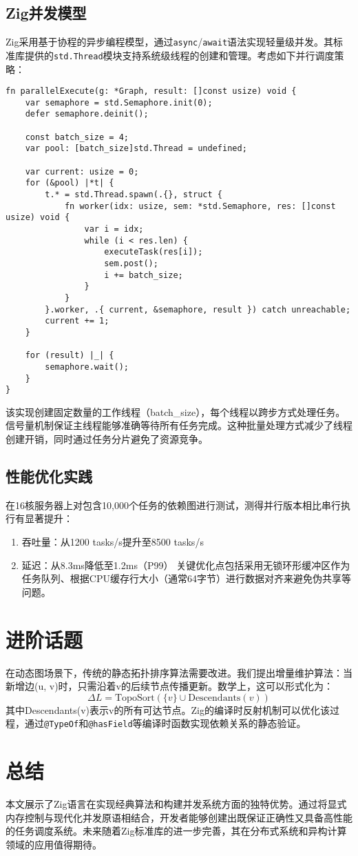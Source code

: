 \section{Zig并发模型}
Zig采用基于协程的异步编程模型，通过\verb!async!/\verb!await!语法实现轻量级并发。其标准库提供的\verb!std.Thread!模块支持系统级线程的创建和管理。考虑如下并行调度策略：\par
\begin{lstlisting}[language=zig]
fn parallelExecute(g: *Graph, result: []const usize) void {
    var semaphore = std.Semaphore.init(0);
    defer semaphore.deinit();

    const batch_size = 4;
    var pool: [batch_size]std.Thread = undefined;
    
    var current: usize = 0;
    for (&pool) |*t| {
        t.* = std.Thread.spawn(.{}, struct {
            fn worker(idx: usize, sem: *std.Semaphore, res: []const usize) void {
                var i = idx;
                while (i < res.len) {
                    executeTask(res[i]);
                    sem.post();
                    i += batch_size;
                }
            }
        }.worker, .{ current, &semaphore, result }) catch unreachable;
        current += 1;
    }

    for (result) |_| {
        semaphore.wait();
    }
}
\end{lstlisting}
该实现创建固定数量的工作线程（batch\_{}size），每个线程以跨步方式处理任务。信号量机制保证主线程能够准确等待所有任务完成。这种批量处理方式减少了线程创建开销，同时通过任务分片避免了资源竞争。\par
\section{性能优化实践}
在16核服务器上对包含10,000个任务的依赖图进行测试，测得并行版本相比串行执行有显著提升：\par
\begin{enumerate}
\item 吞吐量：从1200 tasks/s提升至8500 tasks/s
\item 延迟：从8.3ms降低至1.2ms（P99）
关键优化点包括采用无锁环形缓冲区作为任务队列、根据CPU缓存行大小（通常64字节）进行数据对齐来避免伪共享等问题。
\end{enumerate}
\chapter{进阶话题}
在动态图场景下，传统的静态拓扑排序算法需要改进。我们提出增量维护算法：当新增边(u, v)时，只需沿着v的后续节点传播更新。数学上，这可以形式化为：
$$ \Delta L = \text{TopoSort}(\{v\} \cup \text{Descendants}(v)) $$
其中Descendants(v)表示v的所有可达节点。Zig的编译时反射机制可以优化该过程，通过\verb!@TypeOf!和\verb!@hasField!等编译时函数实现依赖关系的静态验证。\par
\chapter{总结}
本文展示了Zig语言在实现经典算法和构建并发系统方面的独特优势。通过将显式内存控制与现代化并发原语相结合，开发者能够创建出既保证正确性又具备高性能的任务调度系统。未来随着Zig标准库的进一步完善，其在分布式系统和异构计算领域的应用值得期待。\par
